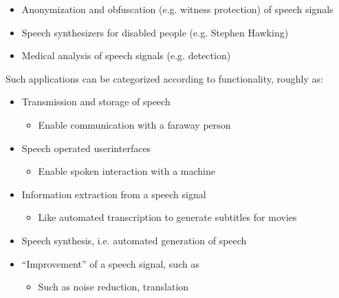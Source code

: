 \documentclass[letterpaper,10pt,english]{jupyterBook}
\begin{document}
\begin{itemize}
\begin{itemize}
\item {} 
\sphinxAtStartPar
Anonymization and obfuscation (e.g. witness protection) of
speech signals

\item {} 
\sphinxAtStartPar
Speech synthesizers for disabled people (e.g. Stephen Hawking)

\item {} 
\sphinxAtStartPar
Medical analysis of speech signals (e.g.
detection)

\end{itemize}

\end{itemize}

\sphinxAtStartPar
{}

\sphinxAtStartPar
Such applications can be categorized according to functionality, roughly
as:
\begin{itemize}
\item {} 
\sphinxAtStartPar
Transmission and storage of speech
\begin{itemize}
\item {} 
\sphinxAtStartPar
Enable communication with a far\sphinxhyphen{}away person

\end{itemize}

\item {} 
\sphinxAtStartPar
Speech operated user\sphinxhyphen{}interfaces
\begin{itemize}
\item {} 
\sphinxAtStartPar
Enable spoken interaction with a machine

\end{itemize}

\item {} 
\sphinxAtStartPar
Information extraction from a speech signal
\begin{itemize}
\item {} 
\sphinxAtStartPar
Like automated transcription to generate subtitles for movies

\end{itemize}

\item {} 
\sphinxAtStartPar
Speech synthesis, i.e. automated generation of speech

\item {} 
\sphinxAtStartPar
“Improvement” of a speech signal, such as
\begin{itemize}
\item {} 
\sphinxAtStartPar
Such as noise reduction, translation

\end{itemize}

\end{itemize}
\end{document}
